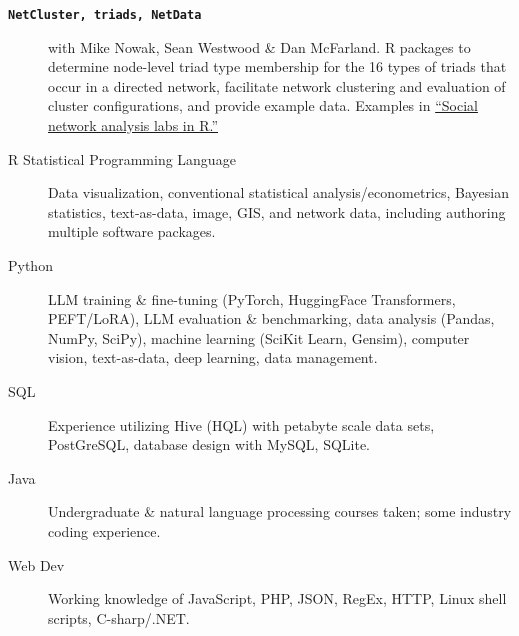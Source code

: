 \documentclass[letterpaper,11pt]{article}
\newcommand{\resheading}[1]{\vspace{4pt}{\large
\colorbox{mygrey}{\begin{minipage}{\textwidth}{\textbf{#1
\vphantom{p\^{E}}}}\end{minipage}}}\vspace{4pt}}
\begin{document}
\begin{description}
\item[\large{\textbf{\texttt{NetCluster, triads, NetData}}}] with Mike Nowak, Sean Westwood \& Dan McFarland. R packages to determine node-level triad type membership for the 16 types of triads that occur in a directed network, facilitate network clustering and evaluation of cluster configurations, and provide example data.  Examples in \href{http://sna.stanford.edu/rlabs.php}{``Social network analysis labs in R.''} 

%

\end{description}

\resheading{Computing}
\begin{description}
\item[R Statistical Programming Language] Data visualization, conventional statistical analysis/econometrics, Bayesian statistics, text-as-data, image, GIS, and network data, including authoring multiple software packages.
\item[Python] LLM training \& fine-tuning (PyTorch, HuggingFace Transformers, PEFT/LoRA), LLM evaluation \& benchmarking, data analysis (Pandas, NumPy, SciPy), machine learning (SciKit Learn, Gensim), computer vision, text-as-data, deep learning, data management.
\item[SQL] Experience utilizing Hive (HQL) with petabyte scale data sets, PostGreSQL, database design with MySQL, SQLite.
\item[Java] Undergraduate \& natural language processing courses taken; some industry coding experience.
\item[Web Dev] Working knowledge of JavaScript, PHP, JSON, RegEx, HTTP, Linux shell scripts, C-sharp/.NET. 
\end{description}
\end{document}
